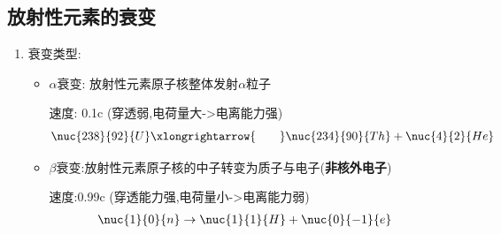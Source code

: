 \documentclass{article}
\begin{document}
\subsection{放射性元素的衰变}
\begin{enumerate}
    \item 衰变类型:
          \begin{itemize}
              \item $\alpha$衰变: 放射性元素原子核整体发射$\alpha$粒子

                    \hspace{3.6em}速度: 0.1c (穿透弱,电荷量大->电离能力强)
                    $$
                        \nuc{238}{92}{U} \xlongrightarrow{\quad\quad} \nuc{234}{90}{Th}  + \nuc{4}{2}{He}
                    $$
              \item $\beta$衰变:放射性元素原子核的中子转变为质子与电子(\textbf{非核外电子})

                    \hspace{3.5em}速度:0.99c (穿透能力强,电荷量小->电离能力弱)
                    $$
                        \begin{aligned}
                            \nuc{1}{0}{n} & \rightarrow \nuc{1}{1}{H} + \nuc{0}{-1}{e}
                        \end{aligned}
                    $$


\end{itemize}
\end{enumerate}
\end{document}
